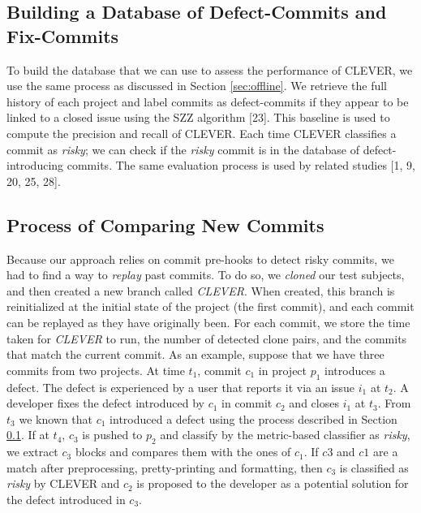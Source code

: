 \documentclass[sigconf]{acmart}
\begin{document}
\subsection{Building a Database of Defect-Commits and
Fix-Commits}\label{sub:golden}

To build the database that we can use to assess the performance of
CLEVER, we use the same process as discussed in Section
\ref{sec:offline}. We retrieve the full history of each project and
label commits as defect-commits if they appear to be linked to a closed
issue using the SZZ algorithm [23]. This baseline is used to compute
the precision and recall of CLEVER. Each time CLEVER classifies a commit
as \emph{risky}; we can check if the \emph{risky} commit is in the
database of defect-introducing commits. The same evaluation process is
used by related studies [1, 9, 20, 25, 28].

\subsection{Process of Comparing New Commits}\label{sec:newcommits}

Because our approach relies on commit pre-hooks to detect risky commits,
we had to find a way to \emph{replay} past commits. To do so, we
\emph{cloned} our test subjects, and then created a new branch called
\emph{CLEVER}. When created, this branch is reinitialized at the initial
state of the project (the first commit), and each commit can be replayed
as they have originally been. For each commit, we store the time taken
for \emph{CLEVER} to run, the number of detected clone pairs, and the
commits that match the current commit. As an example, suppose that we
have three commits from two projects. At time \(t_1\), commit \(c_1\) in
project \(p_1\) introduces a defect. The defect is experienced by a user
that reports it via an issue \(i_1\) at \(t_2\). A developer fixes the
defect introduced by \(c_1\) in commit \(c_2\) and closes \(i_1\) at
\(t_3\). From \(t_3\) we known that \(c_1\) introduced a defect using
the process described in Section \ref{sub:golden}. If at \(t_4\),
\(c_3\) is pushed to \(p_2\) and classify by the metric-based classifier
as \emph{risky}, we extract \(c_3\) blocks and compares them with the
ones of \(c_1\). If \(c3\) and \(c1\) are a match after preprocessing,
pretty-printing and formatting, then \(c_3\) is classified as
\emph{risky} by CLEVER and \(c_2\) is proposed to the developer as a
potential solution for the defect introduced in \(c_3\).
\end{document}

